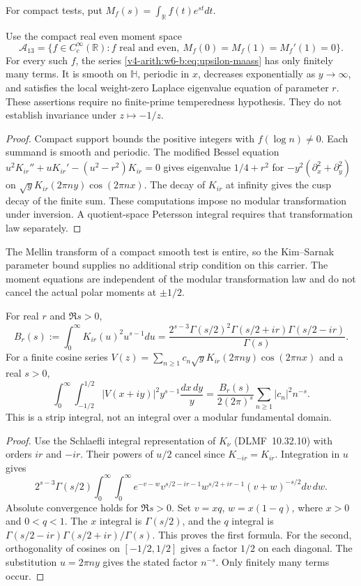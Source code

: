 For compact tests, put $M_f(s)=\int_{\mathbb R}f(t)e^{st}dt$.
\begin{lemma}
\label{v4-arith:w6-b:lem:upsilon-maass-cusp}
Use the compact real even moment space
\begin{equation}
\label{v4-arith:w6-b:eq:PW-maass}
 \mathscr A_{13}=\{f\in C_c^\infty(\mathbb R):f\text{ real and even},
                  \ M_f(0)=M_f(1)=M_f'(1)=0\}.
\end{equation}
For every such $f$, the series
\eqref{v4-arith:w6-b:eq:upsilon-maass} has only finitely many terms.
It is smooth on $\mathbb H$, periodic in $x$, decreases exponentially
as $y\to\infty$, and satisfies the local weight-zero Laplace
eigenvalue equation of parameter $r$. These assertions require
no finite-prime temperedness hypothesis. They do not establish
invariance under $z\mapsto-1/z$.
\end{lemma}
\begin{proof}
Compact support bounds the positive integers with $f(\log n)\ne0$.
Each summand is smooth and periodic. The modified Bessel equation
$u^2K_{ir}''+uK_{ir}'-(u^2-r^2)K_{ir}=0$ gives eigenvalue
$1/4+r^2$ for $-y^2(\partial_x^2+\partial_y^2)$ on
$\sqrt yK_{ir}(2\pi ny)\cos(2\pi nx)$.
The decay of $K_{ir}$ at infinity gives the cusp decay of the
finite sum. These computations impose no modular transformation
under inversion. A quotient-space Petersson integral requires
that transformation law separately.
\end{proof}
The Mellin transform of a compact smooth test is entire, so the
Kim--Sarnak parameter bound supplies no additional strip condition
on this carrier. The moment equations are independent of the
modular transformation law and do not cancel the actual polar
moments at $\pm1/2$.
\begin{proposition}
\label{v4-arith:w6-b:thm:maass-RS}
For real $r$ and $\Re s>0$,
\[
 B_r(s):=\int_0^\infty K_{ir}(u)^2u^{s-1}du
 =\frac{2^{s-3}\Gamma(s/2)^2
          \Gamma(s/2+ir)\Gamma(s/2-ir)}{\Gamma(s)}.
\]
For a finite cosine series $V(z)=\sum_{n\ge1}c_n\sqrt y
K_{ir}(2\pi ny)\cos(2\pi nx)$ and a real $s>0$,
\[
 \int_0^\infty\int_{-1/2}^{1/2}|V(x+iy)|^2y^{s-1}
 \frac{dx\,dy}{y}
 =\frac{B_r(s)}{2(2\pi)^s}\sum_{n\ge1}|c_n|^2n^{-s}.
\]
This is a strip integral, not an integral over a modular fundamental domain.
\end{proposition}
\begin{proof}
Use the Schlaefli integral representation of $K_\nu$
(DLMF~10.32.10) with orders $ir$ and $-ir$.
Their powers of $u/2$ cancel since $K_{-ir}=K_{ir}$.
Integration in $u$ gives
\[
 2^{s-3}\Gamma(s/2)\int_0^\infty\int_0^\infty
 e^{-v-w}v^{s/2-ir-1}w^{s/2+ir-1}(v+w)^{-s/2}dv\,dw.
\]
Absolute convergence holds for $\Re s>0$.
Set $v=xq$, $w=x(1-q)$, where $x>0$ and $0<q<1$.
The $x$ integral is $\Gamma(s/2)$, and the $q$ integral is
$\Gamma(s/2-ir)\Gamma(s/2+ir)/\Gamma(s)$.
This proves the first formula. For the second, orthogonality of
cosines on $[-1/2,1/2]$ gives a factor $1/2$ on each diagonal.
The substitution $u=2\pi ny$ gives the stated factor $n^{-s}$.
Only finitely many terms occur.
\end{proof}

